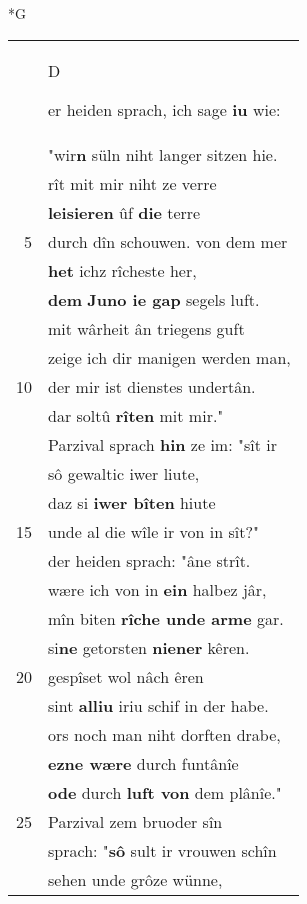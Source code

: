 \documentclass[8pt,a4paper,notitlepage]{article}
\begin{document}
\newpage
\begin{table}[ht]
\begin{minipage}[t]{0.5\linewidth}
\small
\begin{center}*G
\end{center}
\begin{tabular}{rl}
 & \begin{large}D\end{large}er heiden sprach, ich sage \textbf{iu} wie:\\ 
 & "wir\textbf{n} süln niht langer sitzen hie.\\ 
 & rît mit mir niht ze verre\\ 
 & \textbf{leisieren} ûf \textbf{die} terre\\ 
5 & durch dîn schouwen. von dem mer\\ 
 & \textbf{het} ichz rîcheste her,\\ 
 & \textbf{dem} \textbf{Juno ie gap} segels luft.\\ 
 & mit wârheit ân triegens guft\\ 
 & zeige ich dir manigen werden man,\\ 
10 & der mir ist dienstes undertân.\\ 
 & dar soltû \textbf{rîten} mit mir."\\ 
 & Parzival sprach \textbf{hin} ze im: "sît ir\\ 
 & sô gewaltic iwer liute,\\ 
 & daz si \textbf{iwer bîten} hiute\\ 
15 & unde al die wîle ir von in sît?"\\ 
 & der heiden sprach: "âne strît.\\ 
 & wære ich von in \textbf{ein} halbez jâr,\\ 
 & mîn biten \textbf{rîche unde arme} gar.\\ 
 & si\textbf{ne} getorsten \textbf{niener} kêren.\\ 
20 & gespîset wol nâch êren\\ 
 & sint \textbf{alliu} iriu schif in der habe.\\ 
 & ors noch man niht dorften drabe,\\ 
 & \textbf{ezne wære} durch funtânîe\\ 
 & \textbf{ode} durch \textbf{luft von} dem plânîe."\\ 
25 & Parzival zem bruoder sîn\\ 
 & sprach: "\textbf{sô} sult ir vrouwen schîn\\ 
 & sehen unde grôze wünne,\\ 

\end{tabular}
\end{minipage}
\end{table}
\end{document}
